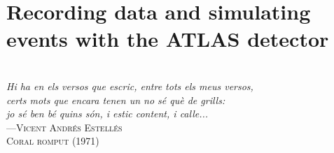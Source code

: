 \begin{comment}
%
%
asdf
\end{comment}

\chapter{Recording data and simulating events with the ATLAS detector}
\label{chap:DataAndMC}


\vspace*{0.1 cm} 
\hspace*{200pt} \\
\hspace*{120pt} \textit{Hi ha en els versos que escric, entre tots els meus versos,} \\
\hspace*{120pt} \textit{certs mots que encara tenen un no sé què de grills: } \\
\hspace*{120pt} \textit{jo sé ben bé quins són, i estic content, i calle... } \\
\hspace*{240pt} ---\textsc{Vicent Andrés Estellés} \\%
\hspace*{265pt}     \textsc{Coral romput (1971)} \\%
\vspace*{2cm} 



